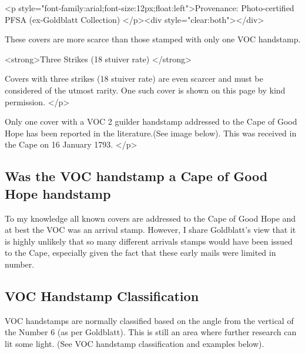 <p style="font-family:arial;font-size:12px;float:left">Provenance: Photo-certified PFSA (ex-Goldblatt Collection) </p><div style="clear:both"></div>            



              
These covers are more scarce than those stamped with only one VOC handstamp.

<strong>Three Strikes (18 stuiver rate) </strong>

Covers with three strikes (18 stuiver rate) are even scarcer and must be considered of the utmost rarity. One such cover  is shown on this page by kind permission. </p>
           
Only one cover with a VOC 2 guilder handstamp addressed to the Cape of Good Hope has been reported in the literature.(See image below). This was received in the Cape on 16 January 1793. </p>


\subsection{Was the VOC handstamp a Cape of Good Hope handstamp}

To my knowledge all known covers are addressed to the Cape of Good Hope 
and at best the VOC was an arrival stamp. However, I share Goldblatt's 
view that it is highly unlikely that so many different arrivals 
stamps would have been issued to the Cape, especially given the 
fact that these early mails were limited in number. 
           
 
            
\subsection{VOC Handstamp Classification 
} 
VOC handstamps are normally 
classified based on the angle from the vertical of the 
Number 6 (as per Goldblatt). 
This is still an area where further research can lit some light. 
(See VOC handstamp classification and examples below).


